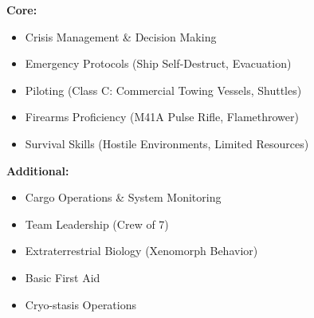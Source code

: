 \textbf{Core:}
\begin{itemize}[label={}, leftmargin=5pt,noitemsep, topsep=2pt, parsep=2pt]
  \item Crisis Management \& Decision Making
  \item Emergency Protocols (Ship Self-Destruct, Evacuation)
  \item Piloting (Class C: Commercial Towing Vessels, Shuttles)
  \item Firearms Proficiency (M41A Pulse Rifle, Flamethrower)
  \item Survival Skills (Hostile Environments, Limited Resources)
\end{itemize}
\vspace{1ex}
\textbf{Additional:}
\begin{itemize}[label={}, leftmargin=5pt,noitemsep, topsep=2pt, parsep=2pt]
  \item Cargo Operations \& System Monitoring
  \item Team Leadership (Crew of 7)
  \item Extraterrestrial Biology (Xenomorph Behavior)
  \item Basic First Aid
  \item Cryo-stasis Operations
\end{itemize}
